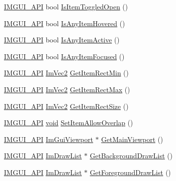 \begin{DoxyCompactItemize}
\item 
\hyperlink{imgui_8h_a43829975e84e45d1149597467a14bbf5}{I\+M\+G\+U\+I\+\_\+\+A\+PI} bool \hyperlink{namespaceImGui_a2f52aab3ede3e1a4a130c88154e1560f}{Is\+Item\+Toggled\+Open} ()
\item 
\hyperlink{imgui_8h_a43829975e84e45d1149597467a14bbf5}{I\+M\+G\+U\+I\+\_\+\+A\+PI} bool \hyperlink{namespaceImGui_a0512146617bb55e24ebcfbe3ce6553d5}{Is\+Any\+Item\+Hovered} ()
\item 
\hyperlink{imgui_8h_a43829975e84e45d1149597467a14bbf5}{I\+M\+G\+U\+I\+\_\+\+A\+PI} bool \hyperlink{namespaceImGui_acdc18199d50d26919312db5f9707b8dc}{Is\+Any\+Item\+Active} ()
\item 
\hyperlink{imgui_8h_a43829975e84e45d1149597467a14bbf5}{I\+M\+G\+U\+I\+\_\+\+A\+PI} bool \hyperlink{namespaceImGui_a89514ca4c0a2b883c878736d92352656}{Is\+Any\+Item\+Focused} ()
\item 
\hyperlink{imgui_8h_a43829975e84e45d1149597467a14bbf5}{I\+M\+G\+U\+I\+\_\+\+A\+PI} \hyperlink{structImVec2}{Im\+Vec2} \hyperlink{namespaceImGui_a65b24b72ec0e8444c705cebf3e91f570}{Get\+Item\+Rect\+Min} ()
\item 
\hyperlink{imgui_8h_a43829975e84e45d1149597467a14bbf5}{I\+M\+G\+U\+I\+\_\+\+A\+PI} \hyperlink{structImVec2}{Im\+Vec2} \hyperlink{namespaceImGui_a3d260209b8dc25a2c942e8cfd1ed0e51}{Get\+Item\+Rect\+Max} ()
\item 
\hyperlink{imgui_8h_a43829975e84e45d1149597467a14bbf5}{I\+M\+G\+U\+I\+\_\+\+A\+PI} \hyperlink{structImVec2}{Im\+Vec2} \hyperlink{namespaceImGui_a3303d1c37041307e11fd46fc43b2274d}{Get\+Item\+Rect\+Size} ()
\item 
\hyperlink{imgui_8h_a43829975e84e45d1149597467a14bbf5}{I\+M\+G\+U\+I\+\_\+\+A\+PI} \hyperlink{imgui__impl__opengl3__loader_8h_ac668e7cffd9e2e9cfee428b9b2f34fa7}{void} \hyperlink{namespaceImGui_a3291356b06ebe5f771d60b334a831d4b}{Set\+Item\+Allow\+Overlap} ()
\item 
\hyperlink{imgui_8h_a43829975e84e45d1149597467a14bbf5}{I\+M\+G\+U\+I\+\_\+\+A\+PI} \hyperlink{structImGuiViewport}{Im\+Gui\+Viewport} $\ast$ \hyperlink{namespaceImGui_a7bf620af1d66ee7d7b06701894d23e60}{Get\+Main\+Viewport} ()
\item 
\hyperlink{imgui_8h_a43829975e84e45d1149597467a14bbf5}{I\+M\+G\+U\+I\+\_\+\+A\+PI} \hyperlink{structImDrawList}{Im\+Draw\+List} $\ast$ \hyperlink{namespaceImGui_ab361971e8b198a11c6ece6b49cf03647}{Get\+Background\+Draw\+List} ()
\item 
\hyperlink{imgui_8h_a43829975e84e45d1149597467a14bbf5}{I\+M\+G\+U\+I\+\_\+\+A\+PI} \hyperlink{structImDrawList}{Im\+Draw\+List} $\ast$ \hyperlink{namespaceImGui_a718d48e3636f9df63e4820d0fef34e78}{Get\+Foreground\+Draw\+List} ()

\end{DoxyCompactItemize}
